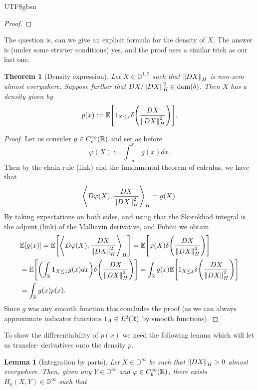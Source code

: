 \documentclass[12pt]{article}
\newtheorem{theorem}{Theorem}
\newtheorem{lemma}{Lemma}
\newcommand{\br}[1]{\left\langle#1\right\rangle}
\begin{document}
\begin{CJK*}{UTF8}{gbsn}
\begin{proof}
	\end{proof}
	The question is, can we give an explicit formula for the density of $X$. The answer is (under some stricter conditions) yes, and the proof uses a similar trick as our last one.
	\begin{theorem}[Density expression]\label{dens exists}
		Let $X\in \mathbb{D}^{1,2}$ such that $\norm{DX}_{H}$ is non-zero almost everywhere. Suppose further that $DX/\norm{DX}^2_{H}\in \text{dom} (\delta )$. Then $X$ has a density given by
		\begin{equation*}
			p(x):=\mathbb{E}\qty[1_{X\leq x}\delta \qty(\frac{DX}{\norm{DX}_{H}^2}) ].
		\end{equation*}
	\end{theorem}
	\begin{proof}
		Let us consider $g\in C_c^\infty({\mathbb R})$ and set as before
		\begin{equation*}
			\varphi(X):=\int_{-\infty}^x g(x)dx.
		\end{equation*}
		Then by the chain rule (link) and the fundamental theorem of calculus, we have that
		\begin{equation*}
			\br{D\varphi(X),\frac{DX}{\norm{DX}^2_{H}}}_{H}=g(X).
		\end{equation*}
		By taking expectations on both sides, and using that the Skorokhod integral is the adjoint (link) of the Malliavin derivative, and Fubini we obtain
		\begin{align*}
			 & \E[g(x)]=\E\qty[\br{D\varphi(X),\frac{DX}{\norm{DX}^2_{H}}}_{H}]=\E\qty[\varphi(X)\delta\qty(\frac{DX}{\norm{DX}_{H}^2})]                                 \\
			 & =\E\qty[\qty(\int_{\R}1_{X\leq x} g(x)dx)\delta\qty(\frac{DX}{\norm{DX}^2_{H}})]=\int_{\R}g(x)\E\qty[1_{X\leq x}\delta \qty(\frac{DX}{\norm{DX}_{H}^2}) ] \\&=\int_{\R}g(x)p(x).
		\end{align*}
		Since $g$ was any smooth function this concludes the proof (as we can always approximate indicator functions $1_A\in L^2({\mathbb R})$ by smooth functions).
	\end{proof}
	To show the differentiability of $p(x)$ we need the following lemma which will let us transfer- derivatives onto the density $p$.
	\begin{lemma}[Integration by parts] Let $X\in \mathbb{D}^{\infty}$ be such that $\norm{DX}_{H}>0$ almost everywhere. Then, given any $Y\in \mathbb{D}^\infty $ and $\varphi \in C_b^\infty({\mathbb R})$, there exists $H_{k}(X,Y)\in \mathbb{D}^\infty$ such that

\end{lemma}
\end{CJK*}
\end{document}
